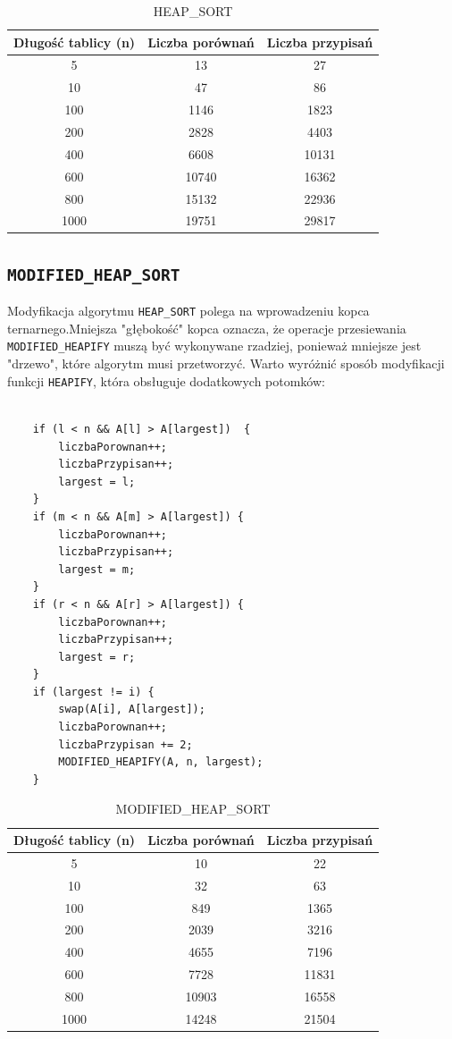 \documentclass{article}
\begin{document}
\begin{table}[h!]
	\centering
	\small
	\begin{tabular}{|c|c|c|}
		\hline
		\textbf{Długość tablicy (n)} & \textbf{Liczba porównań} & \textbf{Liczba przypisań} \\ \hline
		5   & 13    & 27     \\ \hline
		10  & 47    & 86     \\ \hline
		100 & 1146  & 1823   \\ \hline
		200 & 2828  & 4403   \\ \hline
		400 & 6608  & 10131  \\ \hline
		600 & 10740 & 16362  \\ \hline
		800 & 15132 & 22936  \\ \hline
		1000 & 19751 & 29817  \\ \hline
	\end{tabular}
	\caption{HEAP\_SORT}
\end{table}


\subsection{\texttt{MODIFIED\_HEAP\_SORT}}
Modyfikacja algorytmu \texttt{HEAP\_SORT} polega na wprowadzeniu kopca ternarnego.Mniejsza "głębokość" kopca oznacza, że operacje przesiewania \texttt{MODIFIED\_HEAPIFY} muszą być wykonywane rzadziej, ponieważ mniejsze jest "drzewo", które algorytm musi przetworzyć. Warto wyróżnić sposób modyfikacji funkcji \texttt{HEAPIFY}, która obsługuje dodatkowych potomków:
\begin{lstlisting}
	
	if (l < n && A[l] > A[largest])  {
		liczbaPorownan++;
		liczbaPrzypisan++;
		largest = l;
	}
	if (m < n && A[m] > A[largest]) {
		liczbaPorownan++;
		liczbaPrzypisan++;
		largest = m;
	}
	if (r < n && A[r] > A[largest]) {
		liczbaPorownan++;
		liczbaPrzypisan++;
		largest = r;
	}
	if (largest != i) {
		swap(A[i], A[largest]);
		liczbaPorownan++;
		liczbaPrzypisan += 2;
		MODIFIED_HEAPIFY(A, n, largest);
	}
\end{lstlisting}

\begin{table}[h!]
	\centering
	\begin{tabular}{|c|c|c|}
		\hline
		\small
		\textbf{Długość tablicy (n)} & \textbf{Liczba porównań} & \textbf{Liczba przypisań} \\ \hline
		5   & 10    & 22     \\ \hline
		10  & 32    & 63     \\ \hline
		100 & 849   & 1365   \\ \hline
		200 & 2039  & 3216   \\ \hline
		400 & 4655  & 7196   \\ \hline
		600 & 7728  & 11831  \\ \hline
		800 & 10903 & 16558  \\ \hline
		1000 & 14248 & 21504  \\ \hline
	\end{tabular}
	\caption{MODIFIED\_HEAP\_SORT}
	

\end{table}
\end{document}
